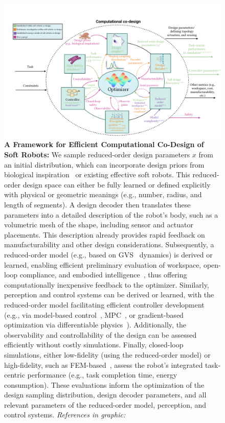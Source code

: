 \begin{figure}[h!]
    \centering
    \includegraphics[width=1\linewidth]{appendix-holistic-codesign/figures/computational_codesign_v1.pdf}
    \caption{\textbf{A Framework for Efficient Computational Co-Design of Soft Robots:}
        We sample reduced-order design parameters $x$ from an initial distribution, which can incorporate design priors from biological inspiration~\citep{mazzolai2020vision, chen2020design, laschi2024bioinspiration} or existing effective soft robots. This reduced-order design space can either be fully learned or defined explicitly with physical or geometric meanings (e.g., number, radius, and length of segments). A design decoder then translates these parameters into a detailed description of the robot’s body, such as a volumetric mesh of the shape, including sensor and actuator placements. This description already provides rapid feedback on manufacturability and other design considerations. Subsequently, a reduced-order model (e.g., based on \gls{GVS}~\citep{renda2020geometric} dynamics) is derived or learned, enabling efficient preliminary evaluation of workspace, open-loop compliance, and embodied intelligence~\citep{cianchetti2021embodied, mengaldo2022concise, vihmar2023measure}, thus offering computationally inexpensive feedback to the optimizer. Similarly, perception and control systems can be derived or learned, with the reduced-order model facilitating efficient controller development (e.g., via model-based control~\citep{della2023model}, \gls{MPC}~\citep{alora2023data}, or gradient-based optimization via differentiable physics~\citep{spielberg2019learning, wang2023softzoo}). Additionally, the observability and controllability of the design can be assessed efficiently without costly simulations. Finally, closed-loop simulations, either low-fidelity (using the reduced-order model) or high-fidelity, such as \gls{FEM}-based~\citep{coevoet2017software}, assess the robot’s integrated task-centric performance (e.g., task completion time, energy consumption). These evaluations inform the optimization of the design sampling distribution, design decoder parameters, and all relevant parameters of the reduced-order model, perception, and control systems. \emph{References in graphic:}  
}
\end{figure}
